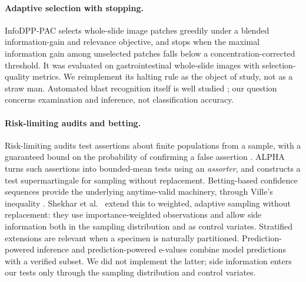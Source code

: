 \documentclass[11pt]{article}
\theoremstyle{remark}
\theoremstyle{definition}
\begin{document}
\paragraph{Adaptive selection with stopping.} InfoDPP-PAC \cite{mittal2026infodpp} selects whole-slide image patches greedily under a blended information-gain and relevance objective, and stops when the maximal information gain among unselected patches falls below a concentration-corrected threshold. It was evaluated on gastrointestinal whole-slide images with selection-quality metrics. We reimplement its halting rule as the object of study, not as a straw man. Automated blast recognition itself is well studied \cite{matek2019aml}; our question concerns examination and inference, not classification accuracy.

\paragraph{Risk-limiting audits and betting.} Risk-limiting audits test assertions about finite populations from a sample, with a guaranteed bound on the probability of confirming a false assertion \cite{lindeman2012gentle}. ALPHA \cite{stark2023alpha} turns such assertions into bounded-mean tests using an \emph{assorter}, and constructs a test supermartingale for sampling without replacement. Betting-based confidence sequences \cite{waudbysmith2024betting} provide the underlying anytime-valid machinery, through Ville's inequality \cite{ville1939}. Shekhar et al.\ \cite{shekhar2023rlfa} extend this to weighted, adaptive sampling without replacement: they use importance-weighted observations and allow side information both in the sampling distribution and as control variates. Stratified extensions \cite{spertus2024stratified} are relevant when a specimen is naturally partitioned. Prediction-powered inference \cite{angelopoulos2023ppi} and prediction-powered e-values \cite{csillag2025ppe} combine model predictions with a verified subset. We did not implement the latter; side information enters our tests only through the sampling distribution and control variates.
\end{document}
